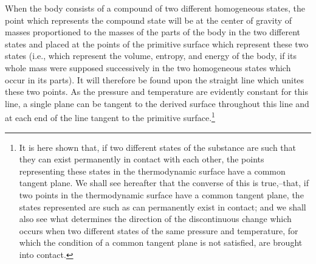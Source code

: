 \documentclass[11pt]{article}
\begin{document}
When the body consists of a compound of two different homogeneous states, the point which represents the compound state will be at the center of gravity of masses proportioned to the masses of the parts of the body in the two different states and placed at the points of the primitive surface which represent these two states (i.e., which represent the volume, entropy, and energy of the body, if its whole mass were supposed successively in the two homogeneous states which occur in its parts). It will therefore be found upon the straight line which unites these two points. As the pressure and temperature are evidently constant for this line, a single plane can be tangent to the derived surface throughout this line and at each end of the line tangent to the primitive surface.\footnote{It is here shown that, if two different states of the substance are such that they can exist permanently in contact with each other, the points representing these states in the thermodynamic surface have a common tangent plane. We shall see hereafter that the converse of this is true,--that, if two points in the thermodynamic surface have a common tangent plane, the states represented are such as can permanently exist in contact; and we shall also see what determines the direction of the discontinuous change which occurs when two different states of the same pressure and temperature, for which the condition of a common tangent plane is not satisfied, are brought into contact.

}
\end{document}

